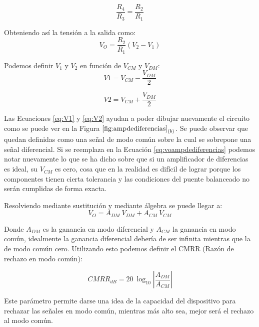 \begin{equation}
\label{eq:puentebalanceado}
	\dfrac{R_4}{R_3} = \dfrac{R_2}{R_1}
\end{equation}
	
	Obteniendo así la tensión a la salida como:
\begin{equation}
\label{eq:voampdediferencias}
V_O= \dfrac{R_2}{R_1} (V_2 - V_1)
\end{equation}	

	Podemos definir $V_1$ y $V_2$ en función de $V_{CM}$ y $V_{DM}$:
\begin{equation}
\label{eq:V1}
V1=V_{CM} - \dfrac{V_{DM}}{2}
\end{equation}

\begin{equation}
\label{eq:V2}
V2=V_{CM} + \dfrac{V_{DM}}{2}
\end{equation}
	
	Las Ecuaciones \ref{eq:V1} y \ref{eq:V2} ayudan a poder dibujar nuevamente el circuito como se puede ver en la Figura $\ref{fig:ampdediferencias}_{(b)}$.
Se puede observar que quedan definidas como una señal de modo común sobre la cual se sobrepone una señal diferencial. Si se reemplaza en la Ecuación \ref{eq:voampdediferencias} podemos notar nuevamente lo que se ha dicho sobre que si un amplificador de diferencias es ideal, su $V_{CM}$ es cero, cosa que en la realidad es difícil de lograr porque los componentes tienen cierta tolerancia y las condiciones del puente balanceado no serán cumplidas de forma exacta. 

	Resolviendo mediante sustitución y mediante álgebra se puede llegar a:
\begin{equation}
\label{eq:voconganancias}
V_O=A_{DM} \ V_{DM} + A_{CM} \ V_{CM}
\end{equation}

	Donde $A_{DM}$ es la ganancia en modo diferencial y $A_{CM}$ la ganancia en modo común, idealmente la ganancia diferencial debería de ser infinita mientras que la de modo común cero. Utilizando esto podemos definir el CMRR (Razón de rechazo en modo común):
	
\begin{equation}
\label{eq:CMRR}
	CMRR_{dB} = 20 \ \log_{10} |\dfrac{A_{DM}}{A_{CM}}|
\end{equation}

	Este parámetro permite darse una idea de la capacidad del dispositivo para rechazar las señales en modo común, mientras más alto sea, mejor será el rechazo al modo común.
	
